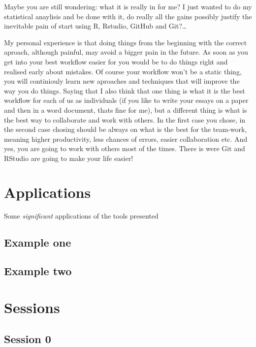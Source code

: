 \documentclass[]{book}
\theoremstyle{definition}
\theoremstyle{definition}
\theoremstyle{definition}
\theoremstyle{remark}
\begin{document}
Maybe you are still wondering: what it is really in for me? I just
wanted to do my statistical anaylisis and be done with it, do really all
the gains possibly justify the inevitable pain of start using R,
Rstudio, GitHub and Git?\ldots{}

My personal experience is that doing things from the beginning with the
correct aproach, although painful, may avoid a bigger pain in the
future. As soon as you get into your best workflow easier for you would
be to do things right and realised early about mistakes. Of course your
workflow won't be a static thing, you will continiouly learn new
aproaches and techniques that will improve the way you do things. Saying
that I also think that one thing is what it is the best workflow for
each of us as individuals (if you like to write your essays on a paper
and then in a word document, thats fine for me), but a different thing
is what is the best way to collaborate and work with others. In the
first case you chose, in the second case chosing should be always on
what is the best for the team-work, meaning higher productivity, less
chances of errors, easier collaboration etc. And yes, you are going to
work with others most of the times. There is were Git and RStudio are
going to make your life easier!

\hypertarget{applications}{%
\chapter{Applications}\label{applications}}

Some \emph{significant} applications of the tools presented

\hypertarget{example-one}{%
\section{Example one}\label{example-one}}

\hypertarget{example-two}{%
\section{Example two}\label{example-two}}

\hypertarget{sessions}{%
\chapter{Sessions}\label{sessions}}

\hypertarget{session-0}{%
\section{Session 0}\label{session-0}}
\end{document}
